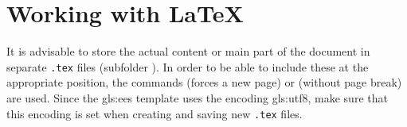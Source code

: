 
\chapter{Working with {\LaTeX}}
\label{cha:latex}
It is advisable to store the actual content or main part of the document in separate \texttt{.tex} files (subfolder \texdir). In order to be able to include these at the appropriate position, the commands \lstinline|| (forces a new page) or \lstinline|| (without page break) are used. Since the \gls{gls:ees} template uses the encoding \gls{gls:utf8}, make sure that this encoding is set when creating and saving new \texttt{.tex} files.














